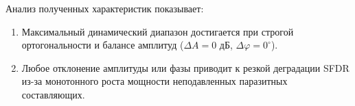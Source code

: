 Анализ полученных характеристик показывает:
\begin{enumerate}
    \item Максимальный динамический диапазон достигается при строгой ортогональности и балансе амплитуд ($\Delta A = 0\text{ дБ}$, $\Delta \varphi = 0^\circ$).
    \item Любое отклонение амплитуды или фазы приводит к резкой деградации SFDR из-за монотонного роста мощности неподавленных паразитных составляющих.
\end{enumerate}
